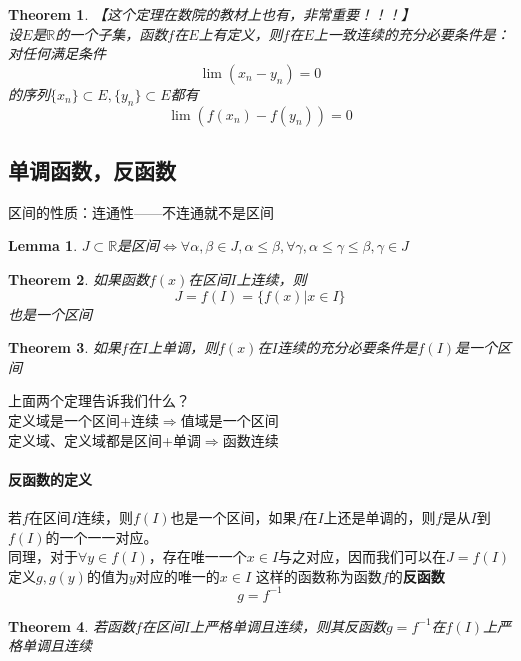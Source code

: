 \documentclass[11pt,hyperref,a4paper,UTF8]{ctexart}
\newtheorem{theorem}{Theorem}[subsection]
\newtheorem{lemma}{Lemma}[subsection]
\begin{document}
\begin{CJK}{UTF8}{gkai}
\begin{theorem}

【这个定理在数院的教材上也有，非常重要！！！】\\
设$E$是$\mathbb{R}$的一个子集，函数$f$在$E$上有定义，则$f$在$E$上一致连续的充分必要条件是：对任何满足条件
\[\lim(x_n-y_n)=0\]
的序列$\{x_n\}\subset E,\{y_n\}\subset E$都有
\[\lim(f(x_n)-f(y_n))=0\]
\end{theorem}

\subsection{单调函数，反函数}

区间的性质：连通性——不连通就不是区间\\
\begin{lemma}
$J\subset\mathbb{R}$是区间$\Leftrightarrow\forall \alpha,\beta\in J,\alpha\leq \beta,\forall\gamma ,\alpha\leq\gamma\leq\beta,\gamma\in J$
\end{lemma}
\begin{theorem}
如果函数$f(x)$在区间$I$上连续，则
\[J=f(I)=\{f(x)|x\in I\}\]
也是一个区间\\
\end{theorem}
\begin{theorem}
如果$f$在$I$上单调，则$f(x)$在$I$连续的充分必要条件是$f(I)$是一个区间\\
\end{theorem}
上面两个定理告诉我们什么？\\
定义域是一个区间+连续$\Rightarrow$值域是一个区间\\
定义域、定义域都是区间+单调$\Rightarrow$函数连续\\

\paragraph{反函数的定义\\}
若$f$在区间$I$连续，则$f(I)$也是一个区间，如果$f$在$I$上还是单调的，则$f$是从$I$到$f(I)$的一个一一对应。\\
同理，对于$\forall y\in f(I)$，存在唯一一个$x\in I$与之对应，因而我们可以在$J=f(I)$定义$g,g(y)$的值为$y$对应的唯一的$x\in I$
这样的函数称为函数$f$的\textbf{反函数}
\[g=f^{-1}\]
\begin{theorem}

若函数$f$在区间$I$上严格单调且连续，则其反函数$g=f^{-1}$在$f(I)$上严格单调且连续\\
\end{theorem}


\end{CJK}
\end{document}
